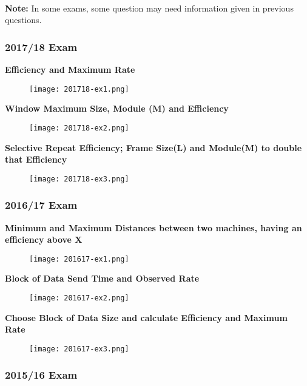 \documentclass[../resumosRCOM.tex]{subfiles}
\begin{document}
\paragraph{}
\textbf{Note: } 
In some exams, some question may need information given in previous questions.

\subsubsection{2017/18 Exam}

\textbf{Efficiency and Maximum Rate}
\begin{figure}[H]
    \centering
    \texttt{[image: 201718-ex1.png]}
\end{figure}

\textbf{Window Maximum Size, Module (M) and Efficiency}
\begin{figure}[H]
    \centering
    \texttt{[image: 201718-ex2.png]}
\end{figure}

\textbf{Selective Repeat Efficiency; Frame Size(L) and Module(M) to double that 
Efficiency}
\begin{figure}[H]
    \centering
    \texttt{[image: 201718-ex3.png]}
\end{figure}



\subsubsection{2016/17 Exam}

\textbf{Minimum and Maximum Distances between two machines, having an 
efficiency above X}
\begin{figure}[H]
    \centering
    \texttt{[image: 201617-ex1.png]}
\end{figure}

\textbf{Block of Data Send Time and Observed Rate}
\begin{figure}[H]
    \centering
    \texttt{[image: 201617-ex2.png]}
\end{figure}

\textbf{Choose Block of Data Size and calculate Efficiency and Maximum Rate}
\begin{figure}[H]
    \centering
    \texttt{[image: 201617-ex3.png]}
\end{figure}

\subsubsection{2015/16 Exam}
\end{document}

